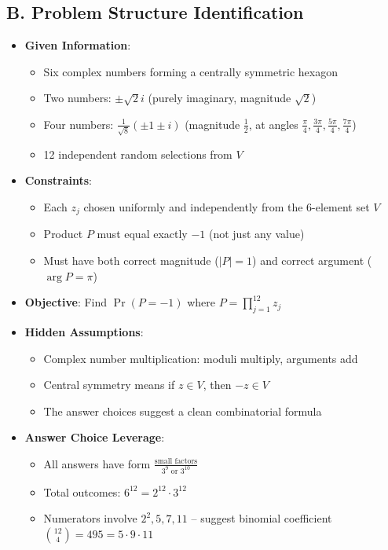 \documentclass[]{article}
\begin{document}
\begin{problemconfigbox}
\subsection*{B. Problem Structure Identification}
\begin{itemize}[leftmargin=*]
    \item \textbf{Given Information}: 
    \begin{itemize}
        \item Six complex numbers forming a centrally symmetric hexagon
        \item Two numbers: $\pm\sqrt{2}i$ (purely imaginary, magnitude $\sqrt{2}$)
        \item Four numbers: $\frac{1}{\sqrt{8}}(\pm 1 \pm i)$ (magnitude $\frac{1}{2}$, at angles $\frac{\pi}{4}, \frac{3\pi}{4}, \frac{5\pi}{4}, \frac{7\pi}{4}$)
        \item 12 independent random selections from $V$
    \end{itemize}
    \item \textbf{Constraints}: 
    \begin{itemize}
        \item Each $z_j$ chosen uniformly and independently from the 6-element set $V$
        \item Product $P$ must equal exactly $-1$ (not just any value)
        \item Must have both correct magnitude ($|P|=1$) and correct argument ($\arg P = \pi$)
    \end{itemize}
    \item \textbf{Objective}: Find $\Pr(P = -1)$ where $P = \prod_{j=1}^{12} z_j$
    \item \textbf{Hidden Assumptions}: 
    \begin{itemize}
        \item Complex number multiplication: moduli multiply, arguments add
        \item Central symmetry means if $z \in V$, then $-z \in V$
        \item The answer choices suggest a clean combinatorial formula
    \end{itemize}
    \item \textbf{Answer Choice Leverage}: 
    \begin{itemize}
        \item All answers have form $\frac{\text{small factors}}{3^{9} \text{ or } 3^{10}}$
        \item Total outcomes: $6^{12} = 2^{12} \cdot 3^{12}$
        \item Numerators involve $2^2, 5, 7, 11$ -- suggest binomial coefficient $\binom{12}{4} = 495 = 5 \cdot 9 \cdot 11$
    \end{itemize}
\end{itemize}


\end{problemconfigbox}
\end{document}
